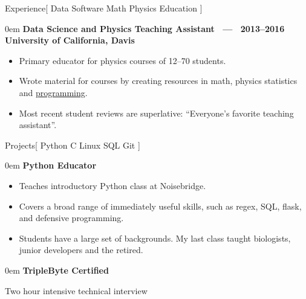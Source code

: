 \documentclass[11pt,a4paper]{article}
\newenvironment{headedsection}[2]{
    \begin{addmargin}[0.5em]{0em}
    {\large\bfseries #1} \hfill {\bfseries #2}%
    \begin{itemize}
        [label={}, topsep=0pt, itemsep=1.5pt, parsep=0pt, leftmargin=1.5em]
}{
    \end{itemize}
    \end{addmargin}
    \medskip
}
\begin{document}
\begin{mysection}{Experience}[
    Data 
    \textbullet{} Software
    \textbullet{} Math
    \textbullet{} Physics
    \textbullet{} Education
]
    \begin{headedsection}
          {Data Science and Physics Teaching Assistant  \ --- \ 2013--2016}
          {University of California, Davis}

        \item Primary educator for physics courses of 12--70 students.
        \item Wrote material for courses by creating resources in math, physics statistics and \href{https://github.com/jgarst/AdvancedLab/releases/download/spring_2016/Python-FirstSteps.pdf}{programming}.
        \item Most recent student reviews are superlative:
            ``Everyone's favorite teaching assistant''.
    \end{headedsection}

\end{mysection}

\begin{mysection}{Projects}[
    Python \textbullet{} C \textbullet{} Linux \textbullet{} SQL \textbullet{} Git
]

    \begin{headedsection}{Python Educator}{}
        \item Teaches introductory Python class at Noisebridge.
        \item Covers a broad range of immediately useful skills, such as regex, SQL, flask, and defensive programming.
        \item Students have a large set of backgrounds.
            My last class taught biologists, junior developers and the retired.
    \end{headedsection}

    \begin{headedsection}{TripleByte Certified}
        \item Two hour intensive technical interview
    \end{headedsection}
\end{mysection}
\end{document}
